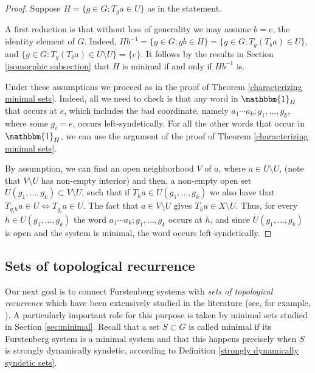 \documentclass{amsart}
\numberwithin{equation}{section}
\theoremstyle{definition}
\theoremstyle{plain}
\begin{document}
\begin{proof}
Suppose $H=\{g\in G: T_ga\in U\}$ as in the statement. 

A first reduction is that without loss of generality we 
may assume $b=e$, the identity element of $G$. Indeed, 
$Hb^{-1}=\{g\in G: gb\in H\}=\{g\in G: T_g(T_{b}a)\in U\}$, and $\{g\in G: T_g(T_ba)\in \overline{U}\setminus U\}=\{e\}$. It follows by the results in Section \ref{isomorphic subsection} that $H$ is minimal if and only if $Hb^{-1}$ is. 

Under these assumptions we proceed as in the proof of 
Theorem \ref{characterizing minimal sets}. Indeed, all 
we need to check is that any word in $\mathbbm{1}_H$ 
that occurs at $e$, which includes the bad coordinate, namely $a_1\cdots a_k;g_1,\dots,g_k$, where some $g_i=e$, occurs left-syndetically. For all the other 
words that occur in $\mathbbm{1}_H$, we can use the 
argument of the proof of Theorem \ref{characterizing minimal sets}.

By assumption, we can find an open neighborhood $V$ of $a$, where $a\in \overline{U}\setminus U$, (note that $V\setminus U$ has non-empty interior) and then, a non-empty open set $U(g_1,\ldots,g_k)\subset V\setminus U$, such that if $T_ha\in U(g_1,\ldots,g_k)$ we also have that $T_{g_ih}a \in U \iff T_{g_i}a\in U$. The fact that $a\in V\setminus U$ gives $T_{h}a\in X\setminus U$. Thus, for every $h\in U(g_1,\ldots,g_k)$ the word $a_1\cdots a_k;g_1,\dots,g_k$ occurs at $h$, and since $U(g_1,\ldots,g_k)$ is open and the system is minimal, the word occurs left-syndetically.
\end{proof}


\subsection{Sets of topological recurrence}
\label{top_recurrence}
Our next goal is to connect Furstenberg systems with 
\textit{sets of topological recurrence} which have been extensively studied in the literature (see, for example, \cite{Donoso_Hernandez_Maass, Forest, GHSW, GKLMRR, Glas_Kouts_Rich, Griezmer1, Griezmer2, Host_Kra_Mass, Huang_Shao_Ye, Katznelson, Kriz}). A particularly important role for this purpose is taken by minimal sets studied in Section \ref{sec:minimal}. 
Recall that a set $S\subset G$ is called minimal if its Furstenberg system 
is a minimal system and that this happens precisely when $S$ is strongly dynamically syndetic, according to Definition \ref{strongly dynamically syndetic sets}.  
\end{document}
